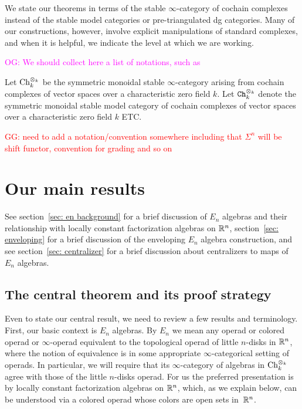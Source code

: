 \documentclass[11pt]{amsart}
\numberwithin{equation}{section}
\def\owen{\textcolor{magenta}{OG: }\textcolor{magenta}}
\def\greg{\textcolor{red}{GG: }\textcolor{red}}
\begin{document}
\begin{rmk}
We state our theorems in terms of the stable $\infty$-category of cochain complexes 
instead of the stable model categories or pre-triangulated dg categories. 
Many of our constructions, however, involve explicit manipulations of standard complexes, 
and when it is helpful, we indicate the level at which we are working.
\end{rmk}

\owen{We should collect here a list of notations, such as}

Let ${\rm Ch}_k^{\otimes_k}$ be the symmetric monoidal stable $\infty$-category arising from cochain complexes of vector spaces over a characteristic zero field $k$.
Let ${\tt Ch}_k^{\otimes_k}$ denote the symmetric monoidal stable model category of cochain complexes of vector spaces over a characteristic zero field $k$ ETC.

\greg{need to add a notation/convention somewhere including that $\Sigma^n$ will be shift functor, convention for grading and so on}

\section{Our main results}

See section~\ref{sec: en background} for a brief discussion of $E_n$ algebras and their relationship with locally constant factorization algebras on $\mathbb R^n$, section~\ref{sec: enveloping} for a brief discussion of the enveloping $E_n$ algebra construction, and see section~\ref{sec: centralizer} 
for a brief discussion about centralizers to maps of $E_n$ algebras.

\subsection{The central theorem and its proof strategy}


Even to state our central result, we need to review a few results and terminology.
First, our basic context is $E_n$ algebras.
By $E_n$ we mean any operad or colored operad or $\infty$-operad equivalent to the topological operad of little $n$-disks in $\mathbb R^n$, where the notion of equivalence is in some appropriate $\infty$-categorical setting of operads. 
In particular, we will require that its $\infty$-category of algebras in ${\rm Ch}_k^{\otimes_k}$ agree with those of the little $n$-disks operad. 
For us the preferred presentation is by locally constant factorization algebras on $\mathbb R^n$,
which, as we explain below, can be understood via a colored operad whose colors are open sets in~$\mathbb R^n$.
\end{document}
